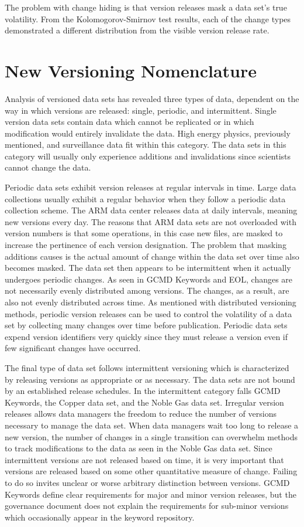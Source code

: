 The problem with change hiding is that version releases mask a data set’s true volatility.  
From the Kolomogorov-Smirnov test results, each of the change types demonstrated a different distribution from the visible version release rate.


\section{New Versioning Nomenclature}
Analysis of versioned data sets has revealed three types of data, dependent on the way in which versions are released: single, periodic, and intermittent.
Single version data sets contain data which cannot be replicated or in which modification would entirely invalidate the data.
High energy physics, previously mentioned, and surveillance data fit within this category.
The data sets in this category will usually only experience additions and invalidations since scientists cannot change the data.

Periodic data sets exhibit version releases at regular intervals in time.  Large data collections usually exhibit a regular behavior when they follow a periodic data collection scheme.
The ARM data center releases data at daily intervals, meaning new versions every day.
The reasons that ARM data sets are not overloaded with version numbers is that some operations, in this case new files, are masked to increase the pertinence of each version designation.
The problem that masking additions causes is the actual amount of change within the data set over time also becomes masked.
The data set then appears to be intermittent when it actually undergoes periodic changes.  As seen in GCMD Keywords and EOL, changes are not necessarily evenly distributed among versions.  The changes, as a result, are also not evenly distributed across time.  As mentioned with distributed versioning methods, periodic version releases can be used to control the volatility of a data set by collecting many changes over time before publication.  Periodic data sets expend version identifiers very quickly since they must release a version even if few significant changes have occurred.

The final type of data set follows intermittent versioning which is characterized by releasing versions as appropriate or as necessary.  The data sets are not bound by an established release schedules.  In the intermittent category falls GCMD Keywords, the Copper data set, and the Noble Gas data set.  Irregular version releases allows data managers the freedom to reduce the number of versions necessary to manage the data set.  When data managers wait too long to release a new version, the number of changes in a single transition can overwhelm methods to track modifications to the data as seen in the Noble Gas data set.  Since intermittent versions are not released based on time, it is very important that versions are released based on some other quantitative measure of change.  Failing to do so invites unclear or worse arbitrary distinction between versions.  GCMD Keywords define clear requirements for major and minor version releases, but the governance document does not explain the requirements for sub-minor versions which occasionally appear in the keyword repository.


